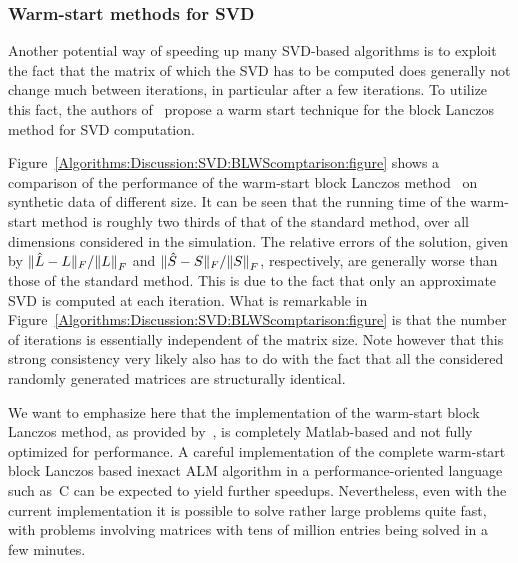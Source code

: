 \documentclass{../../common/projectreport}
\begin{document}
\subsubsection{Warm-start methods for SVD}
\label{Algorithms:Discussion:SVD:WarmstartSVD:Subsubsec}


Another potential way of speeding up many SVD-based algorithms is to exploit the fact that the matrix of which the SVD has to be computed does generally not change much between iterations, in particular after a few iterations. To utilize this fact, the authors of~\cite{Lin:2010uq} propose a warm start technique for the block Lanczos method for SVD computation. 

Figure~\ref{Algorithms:Discussion:SVD:BLWScomptarison:figure} shows a comparison of the performance of the warm-start block Lanczos method~\cite{Lin:2010uq} on synthetic data of different size. It can be seen that the running time of the warm-start method is roughly two thirds of that of the standard method, over all dimensions considered in the simulation. The relative errors of the solution, given by $\|\hat{L}-L\|_F/{\left\|L\right\|}_{F}^{}$ and $\|\hat{S}-S\|_F/{\left\|S\right\|}_{F}^{}$, respectively, are generally worse than those of the standard method. This is due to the fact that only an approximate SVD is computed at each iteration. What is remarkable in Figure~\ref{Algorithms:Discussion:SVD:BLWScomptarison:figure} is that the number of iterations is essentially independent of the matrix size. Note however that this strong consistency very likely also has to do with the fact that all the considered randomly generated matrices are structurally identical. 

We want to emphasize here that the implementation of the warm-start block Lanczos method, as provided by~\cite{Lin:2011kx}, is completely Matlab-based and not fully optimized for performance. A careful implementation of the complete warm-start block Lanczos based inexact ALM algorithm in a performance-oriented language such as~C can be expected to yield further speedups. Nevertheless, even with the current implementation it is possible to solve rather large problems quite fast, with problems involving matrices with tens of million entries being solved in a few minutes. 
\end{document}
